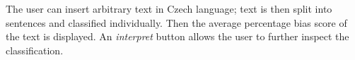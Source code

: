 The user can insert arbitrary text in Czech language; text is then split into sentences and classified individually. Then the average percentage bias score of the text is displayed. An \textit{interpret} button allows the user to further inspect the classification.

\begin{figure}
\end{figure}
